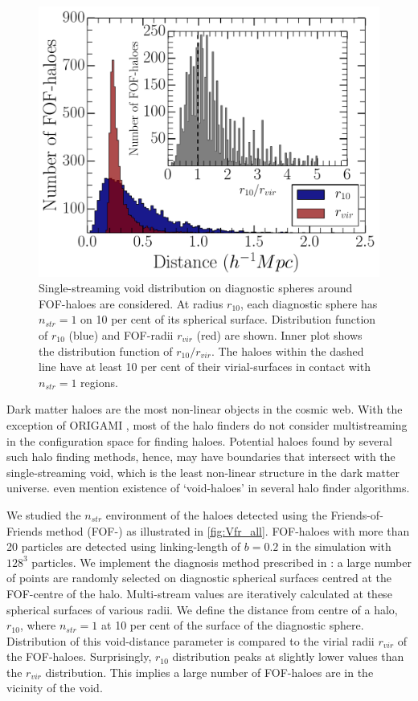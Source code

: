 \documentclass[fleqn,usenatbib,useAMS]{mnras}
\begin{document}
\begin{figure}
\begin{minipage}[t]{.99\linewidth}
\centering\includegraphics[width=8.cm]{fig3.pdf} 
\end{minipage}\hfill
\caption{Single-streaming void distribution on diagnostic spheres around FOF-haloes are considered. At radius $r_{10}$, each diagnostic sphere has $n_{str} = 1$ on 10 per cent of its spherical surface. Distribution function of $r_{10}$ (blue) and FOF-radii $r_{vir}$ (red) are shown. Inner plot shows the distribution function of $r_{10}/r_{vir}$. The haloes within the dashed line have at least 10 per cent of their virial-surfaces in contact with $n_{str} = 1$ regions.}
\label{fig:Vfr_all}
\end{figure}


Dark matter haloes are the most non-linear objects in the cosmic web. With the exception of ORIGAMI \citep{Falck2012}, most of the halo finders do not consider multistreaming in the configuration space for finding haloes. Potential haloes found by several such halo finding methods, hence, may have boundaries that intersect with the single-streaming void, which is the least non-linear structure in the dark matter universe. \cite{Colberg2008} even mention existence of `void-haloes' in several halo finder algorithms.  

We studied the $n_{str}$ environment of the haloes detected using the Friends-of-Friends method (FOF-\citealt{Davis1985}) as illustrated in \autoref{fig:Vfr_all}. FOF-haloes with more than 20 particles are detected using linking-length of $b=0.2$ in the simulation with $128^3$ particles. We implement the diagnosis method prescribed in \cite{Ramachandra2015}: a large number of points are randomly selected on diagnostic spherical surfaces centred at the FOF-centre of the halo. Multi-stream values are iteratively calculated at these spherical surfaces of various radii. We define the distance from centre of a halo, $r_{10}$, where $n_{str} = 1$ at 10 per cent of the surface of the diagnostic sphere. Distribution of this void-distance parameter is compared to the virial radii $r_{vir}$ of the FOF-haloes. Surprisingly, $r_{10}$ distribution peaks at slightly lower values than the $r_{vir}$ distribution. This implies a large number of FOF-haloes are in the vicinity of the void. 
\end{document}
